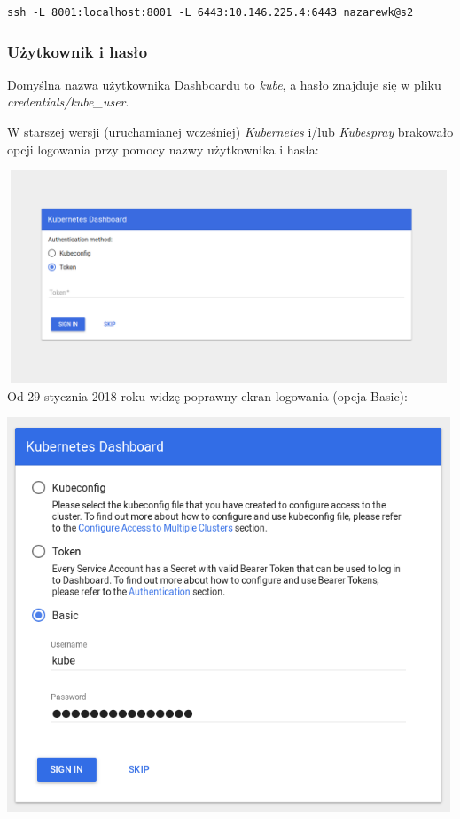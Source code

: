\documentclass[a4paper,12pt,twoside,openany]{report}
\begin{document}
\begin{lstlisting}
ssh -L 8001:localhost:8001 -L 6443:10.146.225.4:6443 nazarewk@s2
\end{lstlisting}

\hypertarget{uux17cytkownik-i-hasux142o}{%
\subsubsection{Użytkownik i hasło}\label{uux17cytkownik-i-hasux142o}}

Domyślna nazwa użytkownika Dashboardu to \emph{kube}, a hasło znajduje
się w pliku \emph{credentials/kube\_user}.

W starszej wersji (uruchamianej wcześniej) \emph{Kubernetes} i/lub
\emph{Kubespray} brakowało opcji logowania przy pomocy nazwy użytkownika
i hasła:

\includegraphics[width=5.20833in,height=2.5in]{assets/dashboard-login-old.png}\\
Od 29 stycznia 2018 roku widzę poprawny ekran logowania (opcja Basic):

\includegraphics[width=5.20833in,height=4.63542in]{assets/dashboard-login-new.png}\\
\end{document}
